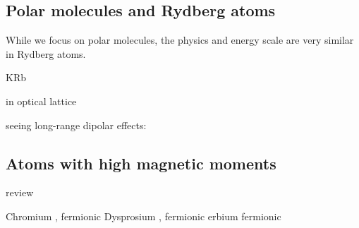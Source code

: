 \subsection{Polar molecules and Rydberg atoms}
While we focus on polar molecules, the physics and energy scale are very similar
in Rydberg atoms.

KRb \cite{Ni2008b,Ospelkaus2010}

in optical lattice \cite{Chotia2012}

seeing long-range dipolar effects:
\cite{Yan2013}


\subsection{Atoms with high magnetic moments}
review \cite{Lahaye2009}

Chromium \cite{Griesmaier2005a,Beaufils2008}, fermionic \cite{Naylor2015}
Dysprosium \cite{Lu2011}, fermionic \cite{Lu2012}
erbium \cite{Aikawa2012} fermionic \cite{Aikawa2014}



